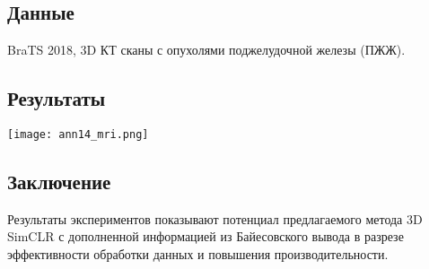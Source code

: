 \subsection*{Данные}
BraTS 2018, 3D КТ сканы с опухолями поджелудочной железы (ПЖЖ).
\subsection*{Результаты}

    
    


\begin{minipage}{1.0\linewidth}
    \begin{center}
        \texttt{[image: ann14\_mri.png]} \\
    \end{center}
    
\end{minipage}

\subsection*{Заключение}
Результаты экспериментов показывают потенциал предлагаемого метода 3D SimCLR с 
дополненной информацией из Байесовского вывода в разрезе эффективности 
обработки данных и повышения производительности. 